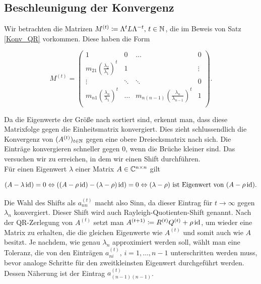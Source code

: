 \documentclass{article}
\begin{document}
\begin{theorem}
\subsection{Beschleunigung der Konvergenz}

Wir betrachten die Matrizen $M^{(t)} \coloneqq \Lambda^t L \Lambda^{-t},\, t \in \mathbb{N}$, die im Beweis von Satz \ref{Konv_QR} vorkommen. Diese haben die Form

\begin{equation*}
	M^{(t)} =
	\left( \begin{array}{cccc}
		1 & 0 & \dots & 0 \\
		m_{21} \left(\frac{\lambda_2}{\lambda_1}\right)^t & 1 &  &\vdots \\
		\vdots & \ddots & \ddots & 0 \\
		m_{n1} \left(\frac{\lambda_n}{\lambda_1}\right)^t & \dots & m_{n(n-1)} \left(\frac{\lambda_n}{\lambda_{n-1}}\right)^t & 1 \\
	\end{array}\right).
\end{equation*}

\vspace{4pt}
Da die Eigenwerte der Größe nach sortiert sind, erkennt man, dass diese Matrixfolge gegen die Einheitsmatrix konvergiert. Dies zieht schlussendlich die Konvergenz von $(A^{(t)})_{t\in \mathbb{N}}$ gegen eine obere Dreiecksmatrix nach sich.
Die Einträge konvergieren schneller gegen $0$, wenn die Brüche kleiner sind. Das versuchen wir zu erreichen, in dem wir einen Shift durchführen.\\
Für einen Eigenwert $\lambda$ einer Matrix $A \in \mathbb{C}^{n\times n}$ gilt

\begin{equation*}
	(A - \lambda \operatorname{id}) = 0 \Leftrightarrow ((A - \rho \operatorname{id}) - (\lambda -\rho) \operatorname{id}) = 0 \Leftrightarrow (\lambda-\rho) \text{ ist Eigenwert von }  (A - \rho \operatorname{id}).
\end{equation*}

Die Wahl des Shifts als $a^{(t)}_{nn}$ macht also Sinn, da dieser Eintrag für $t \rightarrow \infty$ gegen $\lambda_n$ konvergiert. Dieser Shift wird auch Rayleigh-Quotienten-Shift genannt. Nach der QR-Zerlegung von $A^{(t)}$ setzt man $A^{(t+1)} \coloneqq R^{(t)}Q^{(t)} + \rho \operatorname{id}$, um wieder eine Matrix zu erhalten, die die gleichen Eigenwerte wie $A^{(t)}$ und somit auch wie $A$ besitzt.
Je nachdem, wie genau $\lambda_n$ approximiert werden soll, wählt man eine Toleranz, die von den Einträgen $a^{(t)}_{ni}, \, i = 1,\dots, n-1$ unterschritten werden muss, bevor analoge Schritte für den zweitkleinsten Eigenwert durchgeführt werden. Dessen Näherung ist der Eintrag $a^{(t)}_{(n-1)(n-1)}$.


\end{theorem}
\end{document}
